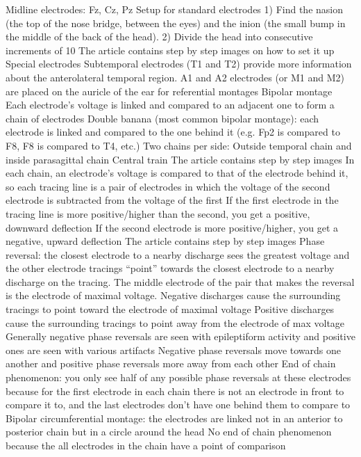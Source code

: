 \documentclass[12pt]{article}
\begin{document}
Midline electrodes: Fz, Cz, Pz
Setup for standard electrodes
1) Find the nasion (the top of the nose bridge, between the eyes) and the inion (the small bump in the middle of the back of the head).
2) Divide the head into consecutive increments of 10%
The article contains step by step images on how to set it up 
Special electrodes
Subtemporal electrodes (T1 and T2) provide more information about the anterolateral temporal region.
A1 and A2 electrodes (or M1 and M2) are placed on the auricle of the ear for referential montages
Bipolar montage 
Each electrode’s voltage is linked and compared to an adjacent one to form a chain of electrodes
Double banana (most common bipolar montage): each electrode is linked and compared to the one behind it (e.g. Fp2 is compared to F8, F8 is compared to T4, etc.) 
Two chains per side: Outside temporal chain and inside parasagittal chain 
Central train 
The article contains step by step images 
In each chain, an electrode’s voltage is compared to that of the electrode behind it, so each tracing line is a pair of electrodes in which the voltage of the second electrode is subtracted from the voltage of the first 
If the first electrode in the tracing line is more positive/higher than the second, you get a positive, downward deflection
If the second electrode is more positive/higher, you get a negative, upward deflection
The article contains step by step images 
Phase reversal: the closest electrode to a nearby discharge sees the greatest voltage and the other electrode tracings “point” towards the closest electrode to a nearby discharge on the tracing.
The middle electrode of the pair that makes the reversal is the electrode of maximal voltage.
Negative discharges cause the surrounding tracings to point toward the electrode of maximal voltage
Positive discharges cause the surrounding tracings to point away from the electrode of max voltage 
Generally negative phase reversals are seen with epileptiform activity and positive ones are seen with various artifacts
Negative phase reversals move towards one another and positive phase reversals more away from each other
End of chain phenomenon: you only see half of any possible phase reversals at these electrodes because for the first electrode in each chain there is not an electrode in front to compare it to, and the last electrodes don’t have one behind them to compare to
Bipolar circumferential montage: the electrodes are linked not in an anterior to posterior chain but in a circle around the head
No end of chain phenomenon because the all electrodes in the chain have a point of comparison 
\end{document}
